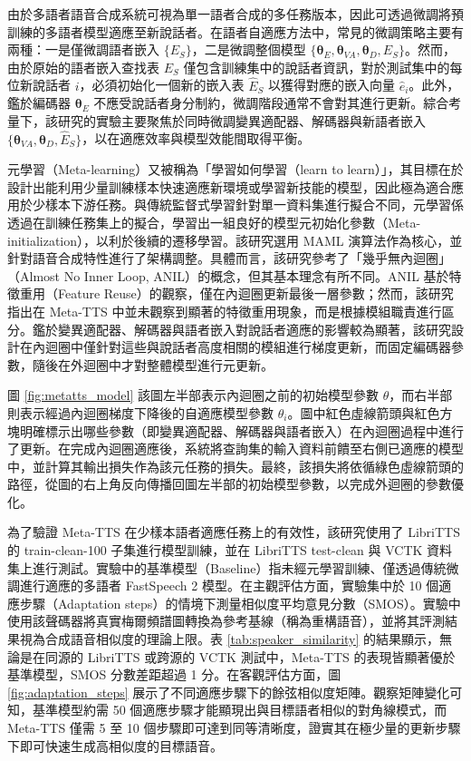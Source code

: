 由於多語者語音合成系統可視為單一語者合成的多任務版本，因此可透過微調將預訓練的多語者模型適應至新說話者。在語者自適應方法中，常見的微調策略主要有兩種：一是僅微調語者嵌入 $\{E_S\}$，二是微調整個模型 $\{\bm{\theta}_E, \bm{\theta}_{VA}, \bm{\theta}_D, E_S\}$。然而，由於原始的語者嵌入查找表 $E_S$ 僅包含訓練集中的說話者資訊，對於測試集中的每位新說話者 $i$，必須初始化一個新的嵌入表 $\hat{E}_S$ 以獲得對應的嵌入向量 $\hat{e}_i$。此外，鑑於編碼器 $\bm{\theta}_E$ 不應受說話者身分制約，微調階段通常不會對其進行更新。綜合考量下，該研究的實驗主要聚焦於同時微調變異適配器、解碼器與新語者嵌入 $\{\bm{\theta}_{VA}, \bm{\theta}_D, \hat{E}_S\}$，以在適應效率與模型效能間取得平衡。

元學習（Meta-learning）又被稱為「學習如何學習（learn to learn）」，其目標在於設計出能利用少量訓練樣本快速適應新環境或學習新技能的模型，因此極為適合應用於少樣本下游任務。與傳統監督式學習針對單一資料集進行擬合不同，元學習係透過在訓練任務集上的擬合，學習出一組良好的模型元初始化參數（Meta-initialization），以利於後續的遷移學習。該研究選用 MAML\cite{finn2017maml} 演算法作為核心，並針對語音合成特性進行了架構調整。具體而言，該研究參考了「幾乎無內迴圈」（Almost No Inner Loop, ANIL）\cite{Raghu2020anil}的概念，但其基本理念有所不同。ANIL 基於特徵重用（Feature Reuse）的觀察，僅在內迴圈更新最後一層參數；然而，該研究指出在 Meta-TTS 中並未觀察到顯著的特徵重用現象，而是根據模組職責進行區分。鑑於變異適配器、解碼器與語者嵌入對說話者適應的影響較為顯著，該研究設計在內迴圈中僅針對這些與說話者高度相關的模組進行梯度更新，而固定編碼器參數，隨後在外迴圈中才對整體模型進行元更新。

圖 \ref{fig:metatts_model} 該圖左半部表示內迴圈之前的初始模型參數 $\theta$，而右半部則表示經過內迴圈梯度下降後的自適應模型參數 $\theta_i$。圖中紅色虛線箭頭與紅色方塊明確標示出哪些參數（即變異適配器、解碼器與語者嵌入）在內迴圈過程中進行了更新。在完成內迴圈適應後，系統將查詢集的輸入資料前饋至右側已適應的模型中，並計算其輸出損失作為該元任務的損失。最終，該損失將依循綠色虛線箭頭的路徑，從圖的右上角反向傳播回圖左半部的初始模型參數，以完成外迴圈的參數優化。

為了驗證 Meta-TTS 在少樣本語者適應任務上的有效性，該研究使用了 LibriTTS 的 train-clean-100 子集進行模型訓練，並在 LibriTTS test-clean 與 VCTK 資料集上進行測試。實驗中的基準模型（Baseline）指未經元學習訓練、僅透過傳統微調進行適應的多語者 FastSpeech 2 模型。在主觀評估方面，實驗集中於 10 個適應步驟（Adaptation steps）的情境下測量相似度平均意見分數（SMOS）。實驗中使用該聲碼器將真實梅爾頻譜圖轉換為參考基線（稱為重構語音），並將其評測結果視為合成語音相似度的理論上限。表 \ref{tab:speaker_similarity} 的結果顯示，無論是在同源的 LibriTTS 或跨源的 VCTK 測試中，Meta-TTS 的表現皆顯著優於基準模型，SMOS 分數差距超過 1 分。在客觀評估方面，圖 \ref{fig:adaptation_steps} 展示了不同適應步驟下的餘弦相似度矩陣。觀察矩陣變化可知，基準模型約需 50 個適應步驟才能顯現出與目標語者相似的對角線模式，而 Meta-TTS 僅需 5 至 10 個步驟即可達到同等清晰度，證實其在極少量的更新步驟下即可快速生成高相似度的目標語音。

